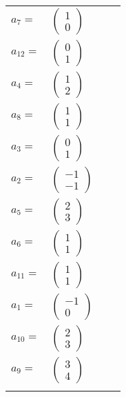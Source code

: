 \documentclass[1p]{elsarticle_modified}
\theoremstyle{definition}
\begin{document}
\begin{tabular}{m{7pt} m{180pt} m{7pt} m{180pt} }
\flushright $a_{7}=$&$\begin{pmatrix}1\\0\end{pmatrix}$ \\
\flushright $a_{12}=$&$\begin{pmatrix}0\\1\end{pmatrix}$ \\
\flushright $a_{4}=$&$\begin{pmatrix}1\\2\end{pmatrix}$ \\
\flushright $a_{8}=$&$\begin{pmatrix}1\\1\end{pmatrix}$ \\
\flushright $a_{3}=$&$\begin{pmatrix}0\\1\end{pmatrix}$ \\
\flushright $a_{2}=$&$\begin{pmatrix}-1\\-1\end{pmatrix}$ \\
\flushright $a_{5}=$&$\begin{pmatrix}2\\3\end{pmatrix}$ \\
\flushright $a_{6}=$&$\begin{pmatrix}1\\1\end{pmatrix}$ \\
\flushright $a_{11}=$&$\begin{pmatrix}1\\1\end{pmatrix}$ \\
\flushright $a_{1}=$&$\begin{pmatrix}-1\\0\end{pmatrix}$ \\
\flushright $a_{10}=$&$\begin{pmatrix}2\\3\end{pmatrix}$ \\
\flushright $a_{9}=$&$\begin{pmatrix}3\\4\end{pmatrix}$\\&\end{tabular}
\end{document}
